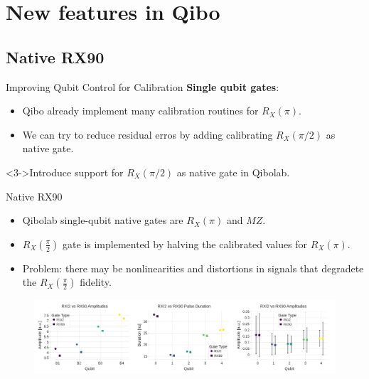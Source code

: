 \documentclass[aspectratio=169,10pt]{beamer}
\begin{document}
\section{New features in Qibo}

\subsection{Native RX90}

\begin{frame}{Improving Qubit Control for Calibration}
  \textbf{Single qubit gates}:
  \begin{itemize}
    \item<1-> Qibo already implement many calibration routines for $R_X(\pi)$.
    \item<2-> We can try to reduce residual erros by adding calibrating $R_X(\pi/2)$ as native gate. 
  \end{itemize}
  <3->Introduce support for $R_X(\pi/2)$ as native gate in Qibolab.
\end{frame}

\begin{frame}{Native RX90}
  \begin{itemize}
    \item<1-> Qibolab single-qubit native gates are $R_X(\pi)$ and $MZ$.
    \item<2-> $R_X(\frac{\pi}{2})$ gate is implemented by halving the calibrated values for $R_X(\pi)$.
    \item<3-> Problem: there may be nonlinearities and distortions in signals that degradete the $R_X(\frac{\pi}{2})$ fidelity.
  \end{itemize}
  \begin{figure}
    \centering
    \includegraphics[width=\textwidth]{figures/RX90.png}
  \end{figure}
\end{frame}
\end{document}
